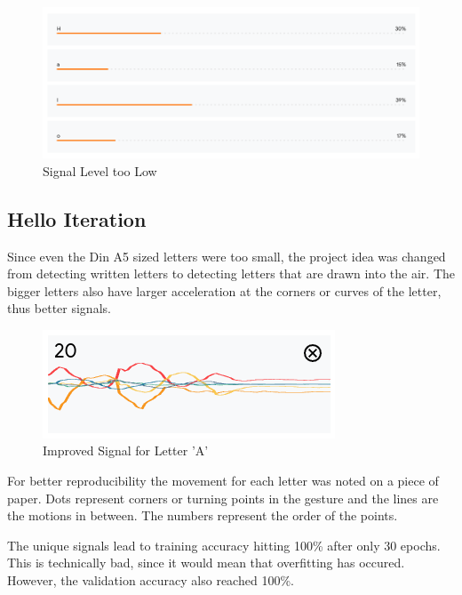\documentclass[a4paper,titlepage]{article}
\begin{document}
\begin{figure}[H]
    \includegraphics[width=\textwidth]{uncertain_results.png}
    \caption{Signal Level too Low}
\end{figure}

\subsection{Hello Iteration}

Since even the Din A5 sized letters were too small, the project idea was changed from detecting written letters to detecting letters that are drawn into the air.
The bigger letters also have larger acceleration at the corners or curves of the letter, thus better signals.

\begin{figure}[H]
    \includegraphics[width=\textwidth]{better_signal_A.png}
    \caption{Improved Signal for Letter 'A'}
\end{figure}

For better reproducibility the movement for each letter was noted on a piece of paper.
Dots represent corners or turning points in the gesture and the lines are the motions in between.
The numbers represent the order of the points.

The unique signals lead to training accuracy hitting 100\% after only 30 epochs.
This is technically bad, since it would mean that overfitting has occured.
However, the validation accuracy also reached 100\%.
\end{document}
